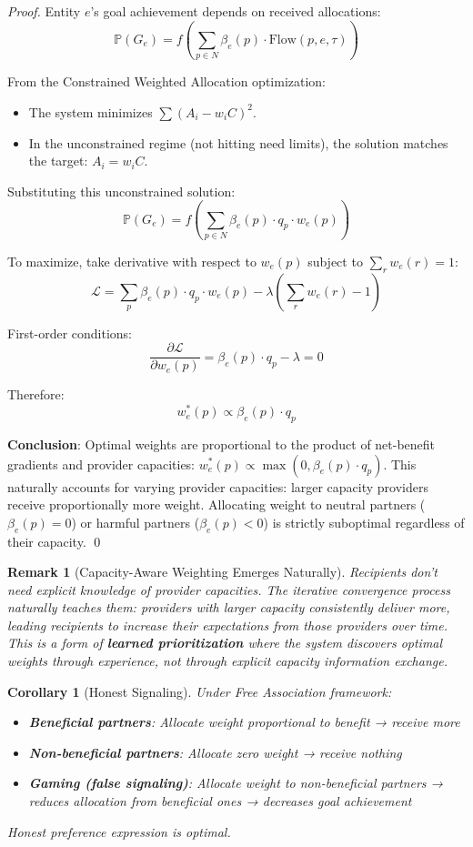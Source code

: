 \documentclass[11pt]{article}
\newtheorem{corollary}{Corollary}
\newtheorem{remark}{Remark}
\begin{document}
\begin{proof}
Entity $e$'s goal achievement depends on received allocations:
\[
\mathbb{P}(G_e) = f\left(\sum_{p \in N} \beta_e(p) \cdot \text{Flow}(p, e, \tau)\right)
\]

From the Constrained Weighted Allocation optimization:
\begin{itemize}
\item The system minimizes $\sum (A_i - w_i C)^2$.
\item In the unconstrained regime (not hitting need limits), the solution matches the target: $A_i = w_i C$.
\end{itemize}

Substituting this unconstrained solution:
\[
\mathbb{P}(G_e) = f\left(\sum_{p \in N} \beta_e(p) \cdot q_p \cdot w_e(p)\right)
\]

To maximize, take derivative with respect to $w_e(p)$ subject to $\sum_r w_e(r) = 1$:
\[
\mathcal{L} = \sum_{p} \beta_e(p) \cdot q_p \cdot w_e(p) - \lambda\left(\sum_r w_e(r) - 1\right)
\]

First-order conditions:
\[
\frac{\partial \mathcal{L}}{\partial w_e(p)} = \beta_e(p) \cdot q_p - \lambda = 0
\]

Therefore:
\[
w_e^*(p) \propto \beta_e(p) \cdot q_p
\]

\textbf{Conclusion}: Optimal weights are proportional to the product of net-benefit gradients and provider capacities: $w_e^*(p) \propto \max(0, \beta_e(p) \cdot q_p)$. This naturally accounts for varying provider capacities: larger capacity providers receive proportionally more weight. Allocating weight to neutral partners ($\beta_e(p) = 0$) or harmful partners ($\beta_e(p) < 0$) is strictly suboptimal regardless of their capacity. \qed
\end{proof}

\begin{remark}[Capacity-Aware Weighting Emerges Naturally]
Recipients don't need explicit knowledge of provider capacities. The iterative convergence process naturally teaches them: providers with larger capacity consistently deliver more, leading recipients to increase their expectations from those providers over time. This is a form of \textbf{learned prioritization} where the system discovers optimal weights through experience, not through explicit capacity information exchange.
\end{remark}

\begin{corollary}[Honest Signaling]
Under Free Association framework:
\begin{itemize}
\item \textbf{Beneficial partners}: Allocate weight proportional to benefit → receive more
\item \textbf{Non-beneficial partners}: Allocate zero weight → receive nothing
\item \textbf{Gaming (false signaling)}: Allocate weight to non-beneficial partners → reduces allocation from beneficial ones → decreases goal achievement
\end{itemize}

Honest preference expression is optimal.
\end{corollary}
\end{document}
